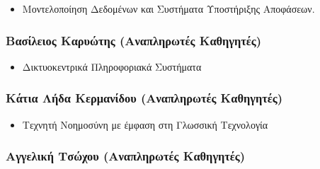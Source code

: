 \documentclass[
]{article}
\begin{document}
\begin{itemize}
\item
  Μοντελοποίηση Δεδομένων και Συστήματα Υποστήριξης Αποφάσεων.
\end{itemize}

\hypertarget{ux3b2ux3b1ux3c3ux3afux3bbux3b5ux3b9ux3bfux3c2-ux3baux3b1ux3c1ux3c5ux3ceux3c4ux3b7ux3c2-ux3b1ux3bdux3b1ux3c0ux3bbux3b7ux3c1ux3c9ux3c4ux3adux3c2-ux3baux3b1ux3b8ux3b7ux3b3ux3b7ux3c4ux3adux3c2}{%
\subsubsection{Βασίλειος Καρυώτης (Αναπληρωτές
Καθηγητές)}\label{ux3b2ux3b1ux3c3ux3afux3bbux3b5ux3b9ux3bfux3c2-ux3baux3b1ux3c1ux3c5ux3ceux3c4ux3b7ux3c2-ux3b1ux3bdux3b1ux3c0ux3bbux3b7ux3c1ux3c9ux3c4ux3adux3c2-ux3baux3b1ux3b8ux3b7ux3b3ux3b7ux3c4ux3adux3c2}}

\begin{itemize}
\item
  Δικτυοκεντρικά Πληροφοριακά Συστήματα
\end{itemize}

\hypertarget{ux3baux3acux3c4ux3b9ux3b1-ux3bbux3aeux3b4ux3b1-ux3baux3b5ux3c1ux3bcux3b1ux3bdux3afux3b4ux3bfux3c5-ux3b1ux3bdux3b1ux3c0ux3bbux3b7ux3c1ux3c9ux3c4ux3adux3c2-ux3baux3b1ux3b8ux3b7ux3b3ux3b7ux3c4ux3adux3c2}{%
\subsubsection{Κάτια Λήδα Κερμανίδου (Αναπληρωτές
Καθηγητές)}\label{ux3baux3acux3c4ux3b9ux3b1-ux3bbux3aeux3b4ux3b1-ux3baux3b5ux3c1ux3bcux3b1ux3bdux3afux3b4ux3bfux3c5-ux3b1ux3bdux3b1ux3c0ux3bbux3b7ux3c1ux3c9ux3c4ux3adux3c2-ux3baux3b1ux3b8ux3b7ux3b3ux3b7ux3c4ux3adux3c2}}

\begin{itemize}
\item
  Τεχνητή Νοημοσύνη με έμφαση στη Γλωσσική Τεχνολογία
\end{itemize}

\hypertarget{ux3b1ux3b3ux3b3ux3b5ux3bbux3b9ux3baux3ae-ux3c4ux3c3ux3ceux3c7ux3bfux3c5-ux3b1ux3bdux3b1ux3c0ux3bbux3b7ux3c1ux3c9ux3c4ux3adux3c2-ux3baux3b1ux3b8ux3b7ux3b3ux3b7ux3c4ux3adux3c2}{%
\subsubsection{Αγγελική Τσώχου (Αναπληρωτές
Καθηγητές)}\label{ux3b1ux3b3ux3b3ux3b5ux3bbux3b9ux3baux3ae-ux3c4ux3c3ux3ceux3c7ux3bfux3c5-ux3b1ux3bdux3b1ux3c0ux3bbux3b7ux3c1ux3c9ux3c4ux3adux3c2-ux3baux3b1ux3b8ux3b7ux3b3ux3b7ux3c4ux3adux3c2}}
\end{document}
